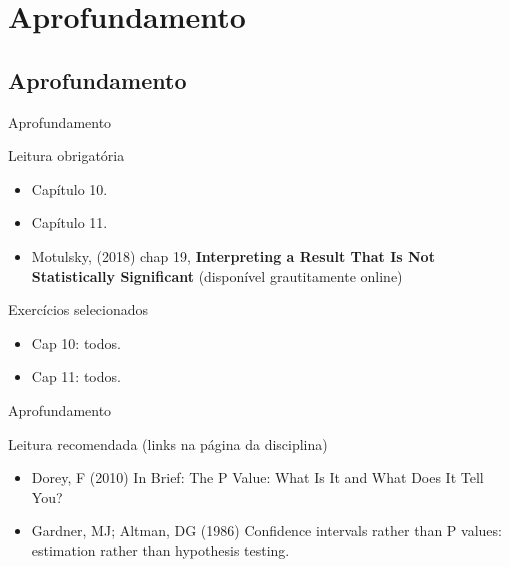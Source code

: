 \documentclass{beamer}
\begin{document}
\section{Aprofundamento}

\subsection{Aprofundamento}

\begin{frame}{Aprofundamento}
  \begin{block}{Leitura obrigatória}
    \footnotesize
    \begin{itemize}
    \item Capítulo 10.
    \item Capítulo 11.
    \item Motulsky, (2018) chap 19, {\bf Interpreting a Result That Is Not Statistically Significant} ({\scriptsize disponível grautitamente online})
    \end{itemize}
  \end{block}
  \begin{block}{Exercícios selecionados}
    \footnotesize
    \begin{itemize}
    \item Cap 10: todos.
    \item Cap 11: todos.
    \end{itemize}
  \end{block}
\end{frame}

\begin{frame}{Aprofundamento}
  \begin{block}{Leitura recomendada (links na página da disciplina)}
    \scriptsize
    \begin{itemize}
    \item Dorey, F (2010) In Brief: The P Value: What Is It and What Does It Tell You?
    \item Gardner, MJ; Altman, DG (1986) Confidence intervals rather than P values: estimation rather than hypothesis testing.
    \end{itemize}
  \end{block}
\end{frame}
\end{document}
